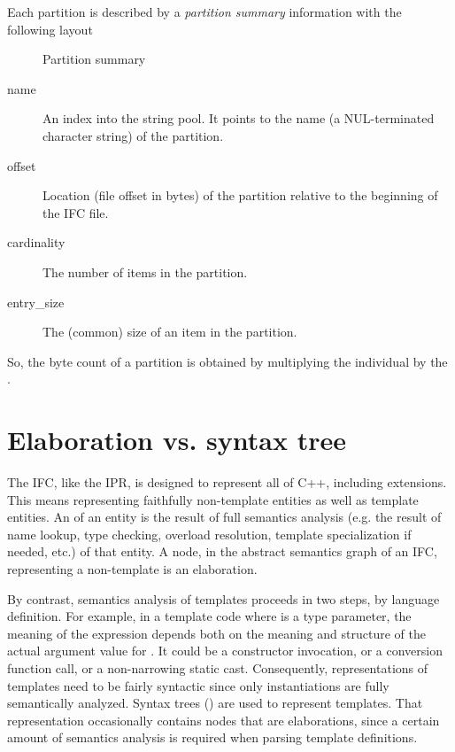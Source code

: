 Each partition is described by a \emph{partition summary} information with the
following layout
\begin{figure}[H]
  \centering
  \caption{Partition summary}
  \label{fig:ifc-partition-summary}
\end{figure}

\begin{description}
\item[name] An index into the string pool.  It points to the name (a
  NUL-terminated character string) of the partition.

\item[offset] Location (file offset in bytes) of the partition relative to the
  beginning of the IFC file.

\item[cardinality] The number of items in the partition.

\item[entry\_size] The (common) size of an item in the partition.
\end{description}

So, the byte count of a partition is obtained by multiplying the individual
 by the .

\section{Elaboration vs. syntax tree}
\label{sec:ifc-elaboration-vs-syntax-tree}

The IFC, like the IPR, is designed to represent all of C++, including extensions.  This means representing faithfully
non-template entities as well as template entities.  An  of an entity is the result of full semantics
analysis (e.g. the result of name lookup, type checking, overload resolution, template specialization if needed, etc.) of that
entity.  A node, in the abstract semantics graph of an IFC, representing a non-template is an elaboration.

By contrast, semantics analysis of templates proceeds in two steps, by language definition.  For example, in a template code where  is a type parameter, the meaning of the expression  depends both on the meaning and structure of the 
actual argument value for .  It could be a constructor invocation, or a conversion function call, or a non-narrowing
static cast.  Consequently, representations of templates need to be fairly syntactic since only instantiations are fully semantically
analyzed.  Syntax trees () are used to represent templates. 
That representation occasionally contains nodes that are
elaborations, since a certain amount of semantics analysis is required when parsing template definitions.

